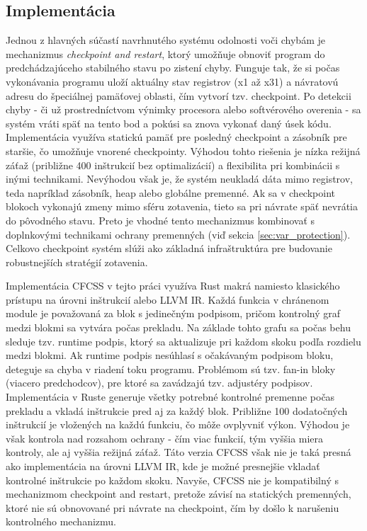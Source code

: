 \documentclass[12pt, letterpaper, slovak]{article}
\begin{document}
\subsection*{Implementácia}

Jednou z hlavných súčastí navrhnutého systému odolnosti voči chybám je mechanizmus \textit{checkpoint and restart}, ktorý umožňuje obnoviť program do predchádzajúceho stabilného stavu po zistení chyby. Funguje tak, že si počas vykonávania programu uloží aktuálny stav registrov (x1 až x31) a návratovú adresu do špeciálnej pamäťovej oblasti, čím vytvorí tzv. checkpoint. Po detekcii chyby - či už prostredníctvom výnimky procesora alebo softvérového overenia - sa systém vráti späť na tento bod a pokúsi sa znova vykonať daný úsek kódu. Implementácia využíva statickú pamäť pre posledný checkpoint a zásobník pre staršie, čo umožňuje vnorené checkpointy. Výhodou tohto riešenia je nízka režijná záťaž (približne 400 inštrukcií bez optimalizácií) a flexibilita pri kombinácii s inými technikami. Nevýhodou však je, že systém neukladá dáta mimo registrov, teda napríklad zásobník, heap alebo globálne premenné. Ak sa v checkpoint blokoch vykonajú zmeny mimo sféru zotavenia, tieto sa pri návrate späť nevrátia do pôvodného stavu. Preto je vhodné tento mechanizmus kombinovať s doplnkovými technikami ochrany premenných (viď sekcia \ref{sec:var_protection}). Celkovo checkpoint systém slúži ako základná infraštruktúra pre budovanie robustnejších stratégií zotavenia.

Implementácia CFCSS v tejto práci využíva Rust makrá namiesto klasického prístupu na úrovni inštrukcií alebo LLVM IR. Každá funkcia v chránenom module je považovaná za blok s jedinečným podpisom, pričom kontrolný graf medzi blokmi sa vytvára počas prekladu. Na základe tohto grafu sa počas behu sleduje tzv. runtime podpis, ktorý sa aktualizuje pri každom skoku podľa rozdielu medzi blokmi. Ak runtime podpis nesúhlasí s očakávaným podpisom bloku, deteguje sa chyba v riadení toku programu. Problémom sú tzv. fan-in bloky (viacero predchodcov), pre ktoré sa zavádzajú tzv. adjustéry podpisov. Implementácia v Ruste generuje všetky potrebné kontrolné premenne počas prekladu a vkladá inštrukcie pred aj za každý blok. Približne 100 dodatočných inštrukcií je vložených na každú funkciu, čo môže ovplyvniť výkon. Výhodou je však kontrola nad rozsahom ochrany - čím viac funkcií, tým vyššia miera kontroly, ale aj vyššia režijná záťaž. Táto verzia CFCSS však nie je taká presná ako implementácia na úrovni LLVM IR, kde je možné presnejšie vkladať kontrolné inštrukcie po každom skoku. Navyše, CFCSS nie je kompatibilný s mechanizmom checkpoint and restart, pretože závisí na statických premenných, ktoré nie sú obnovované pri návrate na checkpoint, čím by došlo k narušeniu kontrolného mechanizmu.
\end{document}
